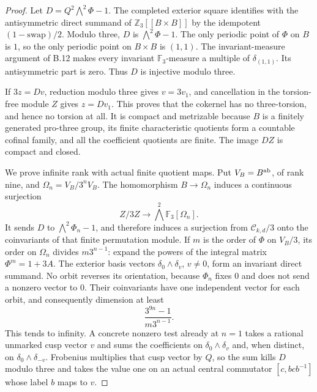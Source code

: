 \begin{proof}
Let $D=Q^2\bigwedge^2\Phi-1$.
The completed exterior square identifies with the
antisymmetric direct summand of
$\mathbb Z_3[[B\times B]]$ by the idempotent
$(1-\mathrm{swap})/2$.
Modulo three, $D$ is $\bigwedge^2\Phi-1$.
The only periodic point of $\Phi$ on $B$ is $1$,
so the only periodic point on $B\times B$ is
$(1,1)$. The invariant-measure argument of B.12
makes every invariant $\mathbb F_3$-measure a
multiple of $\delta_{(1,1)}$. Its antisymmetric
part is zero. Thus $D$ is injective modulo three.

If $3z=Dv$, reduction modulo three gives $v=3v_1$,
and cancellation in the torsion-free module $Z$
gives $z=Dv_1$. This proves that the cokernel has
no three-torsion, and hence no torsion at all.
It is compact and metrizable because $B$ is a
finitely generated pro-three group, its finite
characteristic quotients form a countable cofinal
family, and all the coefficient quotients are
finite. The image $DZ$ is compact and closed.

We prove infinite rank with actual finite quotient
maps. Put $V_B=B^{\rm ab}$, of rank nine, and
$\Omega_n=V_B/3^nV_B$.
The homomorphism $B\to\Omega_n$ induces a continuous
surjection
\[
 Z/3Z\longrightarrow\bigwedge^2\mathbb F_3[\Omega_n].
 \]
It sends $D$ to $\bigwedge^2\Phi_n-1$, and therefore
induces a surjection from $\mathcal C_{k,d}/3$ onto
the coinvariants of that finite permutation module.
If $m$ is the order of $\Phi$ on $V_B/3$, its order
on $\Omega_n$ divides $m3^{n-1}$: expand the powers
of the integral matrix $\Phi^m=1+3A$.
The exterior basis vectors
$\delta_0\wedge\delta_v$, $v\ne0$, form an invariant
direct summand. No orbit reverses its orientation,
because $\Phi_n$ fixes $0$ and does not send a
nonzero vector to $0$.
Their coinvariants have one independent vector
for each orbit, and consequently dimension at least
\[
                      \frac{3^{9n}-1}{m3^{n-1}} .
 \]
This tends to infinity. A concrete nonzero test
already at $n=1$ takes a rational unmarked cusp
vector $v$ and sums the coefficients on
$\delta_0\wedge\delta_v$ and, when distinct, on
$\delta_0\wedge\delta_{-v}$.
Frobenius multiplies that cusp vector by $Q$,
so the sum kills $D$ modulo three and takes the
value one on an actual central commutator
$[c,bcb^{-1}]$ whose label $b$ maps to $v$.


\end{proof}
